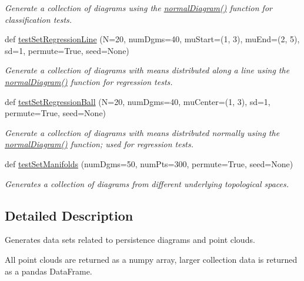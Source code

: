 \begin{DoxyCompactItemize}
\begin{DoxyCompactList}\small\item\em Generate a collection of diagrams using the \hyperlink{namespaceteaspoon_1_1_make_data_1_1_point_cloud_afb6f087ced9440d9c2834a2a35e4344c}{normal\+Diagram()} function for classification tests. \end{DoxyCompactList}\item 
def \hyperlink{namespaceteaspoon_1_1_make_data_1_1_point_cloud_a438eee01f88fa160eac50510250b536d}{test\+Set\+Regression\+Line} (N=20, num\+Dgms=40, mu\+Start=(1, 3), mu\+End=(2, 5), sd=1, permute=True, seed=None)
\begin{DoxyCompactList}\small\item\em Generate a collection of diagrams with means distributed along a line using the \hyperlink{namespaceteaspoon_1_1_make_data_1_1_point_cloud_afb6f087ced9440d9c2834a2a35e4344c}{normal\+Diagram()} function for regression tests. \end{DoxyCompactList}\item 
def \hyperlink{namespaceteaspoon_1_1_make_data_1_1_point_cloud_a5d59e8a0b850c8d65c3f421d72486d35}{test\+Set\+Regression\+Ball} (N=20, num\+Dgms=40, mu\+Center=(1, 3), sd=1, permute=True, seed=None)
\begin{DoxyCompactList}\small\item\em Generate a collection of diagrams with means distributed normally using the \hyperlink{namespaceteaspoon_1_1_make_data_1_1_point_cloud_afb6f087ced9440d9c2834a2a35e4344c}{normal\+Diagram()} function; used for regression tests. \end{DoxyCompactList}\item 
def \hyperlink{namespaceteaspoon_1_1_make_data_1_1_point_cloud_a5d9c892f9f0a63f64437cbbde9048aeb}{test\+Set\+Manifolds} (num\+Dgms=50, num\+Pts=300, permute=True, seed=None)
\begin{DoxyCompactList}\small\item\em Generates a collection of diagrams from different underlying topological spaces. \end{DoxyCompactList}\end{DoxyCompactItemize}


\subsection{Detailed Description}
Generates data sets related to persistence diagrams and point clouds. 

All point clouds are returned as a numpy array, larger collection data is returned as a pandas Data\+Frame. 

